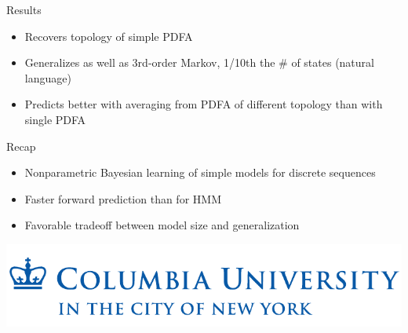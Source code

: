 \documentclass[16pt]{beamer}
\begin{document}
\begin{frame}
	\begin{block}{Results}
		\begin{itemize}
			\item{Recovers topology of simple PDFA}
			\item{Generalizes as well as 3rd-order Markov, 1/10th the \# of states (natural language)}
			\item{Predicts better with averaging from PDFA of different topology than with single PDFA}
		\end{itemize}
	\end{block}
	\begin{block}{Recap}
		\begin{itemize}
			\item{Nonparametric Bayesian learning of simple models for discrete sequences}
			\item{Faster forward prediction than for HMM}
			\item{Favorable tradeoff between model size and generalization}
		\end{itemize}
	\end{block}
	\vfill\vspace{.51cm}\hfill\includegraphics[scale=0.2]{columbia_logo.pdf}
\end{frame}
\end{document}
